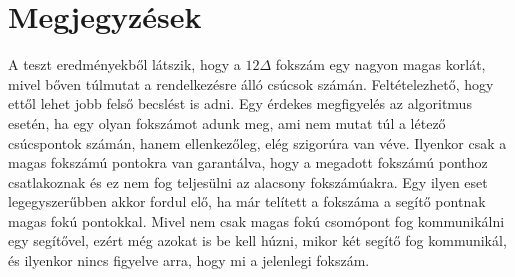 \documentclass[12pt]{report}
\begin{document}
\section{Megjegyzések}

A teszt eredményekből látszik, hogy a $12\Delta$ fokszám egy nagyon magas korlát, mivel bőven túlmutat a rendelkezésre álló csúcsok számán. Feltételezhető, hogy ettől lehet jobb felső becslést is adni. 
Egy érdekes megfigyelés az algoritmus esetén, ha egy olyan fokszámot adunk meg, ami nem mutat túl a létező csúcspontok számán, hanem ellenkezőleg, elég szigorúra van véve.
Ilyenkor csak a magas fokszámú pontokra van garantálva, hogy a megadott fokszámú ponthoz csatlakoznak és ez nem fog teljesülni az alacsony fokszámúakra.
Egy ilyen eset legegyszerűbben akkor fordul elő, ha már telített a fokszáma a segítő pontnak magas fokú pontokkal. 
Mivel nem csak magas fokú csomópont fog kommunikálni egy segítővel, ezért még azokat is be kell húzni, mikor két segítő fog kommunikál, és ilyenkor nincs figyelve arra, hogy mi a jelenlegi fokszám. 




	
\end{document}
